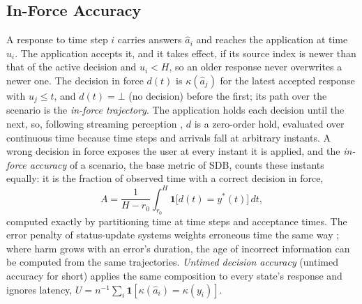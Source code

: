 \documentclass[11pt]{article}
\newcommand{\sdb}{SDB}
\newcommand{\ind}{\mathbf{1}}
\newcommand{\yref}{y^{*}}
\begin{document}
\subsection{In-Force Accuracy}
\label{sec:inforce}
A response to time step $i$ carries answers $\hat a_i$ and reaches the application at time $u_i$.
The application accepts it, and it takes effect, if its source index is newer than that of the active decision and $u_i<H$, so an older response never overwrites a newer one.
The decision in force $d(t)$ is $\kappa(\hat a_j)$ for the latest accepted response with $u_j\le t$, and $d(t)=\bot$ (no decision) before the first; its path over the scenario is the \emph{in-force trajectory}.
The application holds each decision until the next, so, following streaming perception \citep{li2020towards}, $d$ is a zero-order hold, evaluated over continuous time because time steps and arrivals fall at arbitrary instants.
A wrong decision in force exposes the user at every instant it is applied, and the \emph{in-force accuracy} of a scenario, the base metric of \sdb, counts these instants equally: it is the fraction of observed time with a correct decision in force,
\begin{equation}
  A=\frac{1}{H-r_0}\int_{r_0}^{H}\ind\bigl[d(t)=\yref(t)\bigr]\,dt,
  \label{eq:inforce}
\end{equation}
computed exactly by partitioning time at time steps and acceptance times.
The error penalty of status-update systems weights erroneous time the same way \citep{maatouk2020age,maatouk2023age}; where harm grows with an error's duration, the age of incorrect information \citep{maatouk2020age} can be computed from the same trajectories.
\emph{Untimed decision accuracy} (untimed accuracy for short) applies the same composition to every state's response and ignores latency, $U=n^{-1}\sum_i\ind[\kappa(\hat a_i)=\kappa(y_i)]$.
\end{document}

